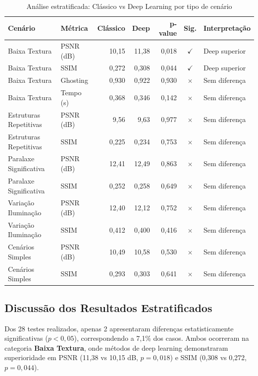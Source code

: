 \begin{table}[htb]
\centering
\caption{Análise estratificada: Clássico vs Deep Learning por tipo de cenário}
\label{tab:estratificado}
\scriptsize
\begin{tabular}{llrrrcp{2.5cm}}
\hline
\textbf{Cenário} & \textbf{Métrica} & \textbf{Clássico} & \textbf{Deep} & \textbf{p-value} & \textbf{Sig.} & \textbf{Interpretação} \\ \hline
Baixa Textura & PSNR (dB) & 10,15 & 11,38 & 0,018 & $\checkmark$ & Deep superior \\
Baixa Textura & SSIM & 0,272 & 0,308 & 0,044 & $\checkmark$ & Deep superior \\
Baixa Textura & Ghosting & 0,930 & 0,922 & 0,930 & $\times$ & Sem diferença \\
Baixa Textura & Tempo (s) & 0,368 & 0,346 & 0,142 & $\times$ & Sem diferença \\
Estruturas Repetitivas & PSNR (dB) & 9,56 & 9,63 & 0,977 & $\times$ & Sem diferença \\
Estruturas Repetitivas & SSIM & 0,225 & 0,234 & 0,753 & $\times$ & Sem diferença \\
Paralaxe Significativa & PSNR (dB) & 12,41 & 12,49 & 0,863 & $\times$ & Sem diferença \\
Paralaxe Significativa & SSIM & 0,252 & 0,258 & 0,649 & $\times$ & Sem diferença \\
Variação Iluminação & PSNR (dB) & 12,40 & 12,12 & 0,752 & $\times$ & Sem diferença \\
Variação Iluminação & SSIM & 0,412 & 0,400 & 0,416 & $\times$ & Sem diferença \\
Cenários Simples & PSNR (dB) & 10,49 & 10,58 & 0,530 & $\times$ & Sem diferença \\
Cenários Simples & SSIM & 0,293 & 0,303 & 0,641 & $\times$ & Sem diferença \\
\hline
\end{tabular}
\end{table}

\subsection{Discussão dos Resultados Estratificados}

Dos 28 testes realizados, apenas 2 apresentaram diferenças estatisticamente significativas ($p<0{,}05$), correspondendo a 7,1\% dos casos. Ambos ocorreram na categoria \textbf{Baixa Textura}, onde métodos de deep learning demonstraram superioridade em PSNR (11,38 vs 10,15 dB, $p=0{,}018$) e SSIM (0,308 vs 0,272, $p=0{,}044$).


